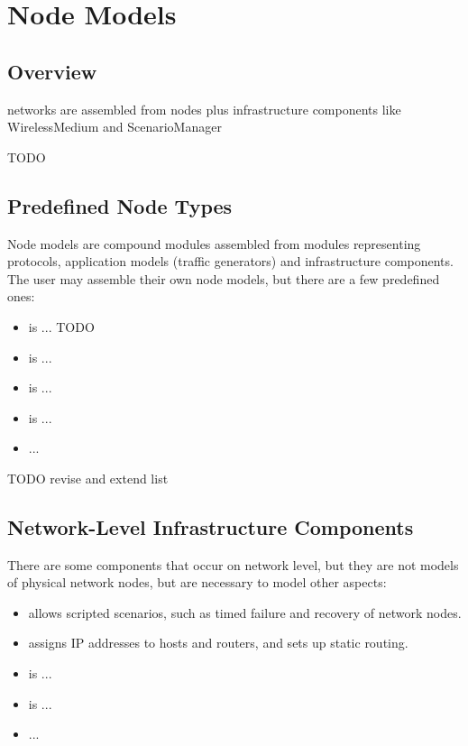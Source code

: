 \chapter{Node Models}
\label{cha:node-models}

\section{Overview}

networks are assembled from nodes plus infrastructure components like WirelessMedium
and ScenarioManager 

TODO

\section{Predefined Node Types}

Node models are compound modules assembled from modules representing
protocols, application models (traffic generators) and infrastructure
components. The user may assemble their own node models, but there
are a few predefined ones:

\begin{itemize}
\item {} is ... TODO
\item {} is ...
\item {} is ...
\item {} is ...
\item ...
\end{itemize}

TODO revise and extend list

\section{Network-Level Infrastructure Components}

There are some components that occur on network level, but they
are not models of physical network nodes, but are necessary 
to model other aspects:

\begin{itemize}
  \item {} allows scripted scenarios, such
     as timed failure and recovery of network nodes.
  \item {} assigns IP addresses 
     to hosts and routers, and sets up static routing.
\item {} is ...
\item {} is ...
\item ...
\end{itemize}

